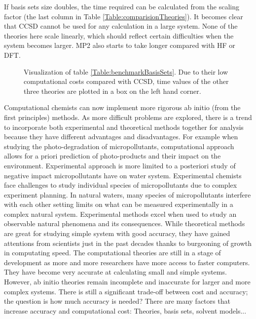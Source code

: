 \documentclass[
journal=jpcbfk, %
manuscript=article]{achemso}
\begin{document}
	If basis sets size doubles, the time required can be calculated from the scaling factor (the last column in Table \ref{Table:comparisionTheories}). It becomes clear that CCSD cannot be used for any calculation in a large system. None of the theories here scale linearly, which should reflect certain difficulties when the system becomes larger. MP2 also starts to take longer compared with HF or DFT. 
	\begin{figure}
		\vspace{-20pt}
		\centering
		\caption{Visualization of table \ref{Table:benchmarkBasisSets}. Due to their low computational costs compared with CCSD, time values of the other three theories are plotted in a box on the left hand corner. }\label{fig:bench}
		\vspace{-10pt}
	\end{figure}
	Computational chemists can now implement more rigorous ab initio (from the first principles) methods. As more difficult problems are explored, there is a trend to incorporate both experimental and theoretical methods together for analysis because they have different advantages and disadvantages. For example when studying the photo-degradation of micropollutants, computational approach allows for a priori prediction of photo-products and their impact on the environment. Experimental approach is more limited to a posteriori study of negative impact micropollutants have on water system. Experimental chemists face challenges to study individual species of micropollutants due to complex experiment planning. In natural waters, many species of micropollutants interfere with each other setting limits on what can be measured experimentally in a complex natural system. Experimental methods excel when used to study an observable natural phenomena and its consequences. While theoretical methods are great for studying simple system with good accuracy, they have gained attentions from scientists just in the past decades thanks to burgeoning of growth in computating speed. The computational theories are still in a stage of development as more and more researchers have more access to faster computers. They have become very accurate at calculating small and simple systems. However, ab initio theories remain incomplete and inaccurate for larger and more complex systems. There is still a significant trade-off between cost and accuracy; the question is how much accuracy is needed? There are many factors that increase accuracy and computational cost: Theories, basis sets, solvent models... 
\end{document}
